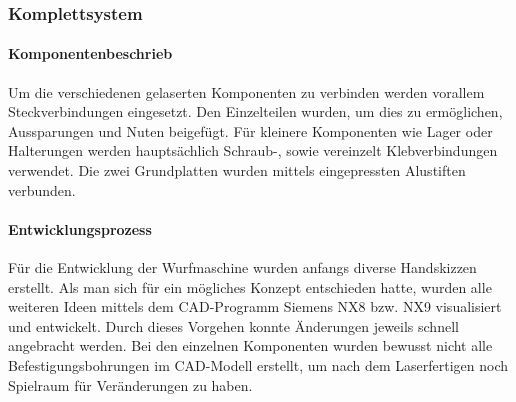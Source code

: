 \subsubsection{Komplettsystem}

\paragraph{Komponentenbeschrieb}

Um die verschiedenen gelaserten Komponenten zu verbinden werden vorallem Steckverbindungen eingesetzt. Den Einzelteilen wurden, um dies zu ermöglichen, Aussparungen und Nuten beigefügt. Für kleinere Komponenten wie Lager oder Halterungen werden hauptsächlich Schraub-, sowie vereinzelt Klebverbindungen verwendet. Die zwei Grundplatten wurden mittels eingepressten Alustiften verbunden. 

\paragraph{Entwicklungsprozess}

Für die Entwicklung der Wurfmaschine wurden anfangs diverse Handskizzen erstellt. Als man sich für ein mögliches Konzept entschieden hatte, wurden alle weiteren Ideen mittels dem CAD-Programm Siemens NX8 bzw. NX9 visualisiert und entwickelt. Durch dieses Vorgehen konnte Änderungen jeweils schnell angebracht werden. Bei den einzelnen Komponenten wurden bewusst nicht alle Befestigungsbohrungen im CAD-Modell erstellt, um nach dem Laserfertigen noch Spielraum für Veränderungen zu haben.